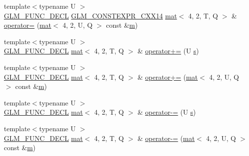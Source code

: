 \begin{DoxyCompactItemize}
\item 
{\footnotesize template$<$typename U $>$ }\\\mbox{\hyperlink{setup_8hpp_ab2d052de21a70539923e9bcbf6e83a51}{G\+L\+M\+\_\+\+F\+U\+N\+C\+\_\+\+D\+E\+CL}} \mbox{\hyperlink{setup_8hpp_a4dd12abf5e1164bc57f3a34671d03844}{G\+L\+M\+\_\+\+C\+O\+N\+S\+T\+E\+X\+P\+R\+\_\+\+C\+X\+X14}} \mbox{\hyperlink{structglm_1_1mat}{mat}}$<$ 4, 2, T, Q $>$ \& \mbox{\hyperlink{structglm_1_1mat_3_014_00_012_00_01_t_00_01_q_01_4_a40494ccea0b2ac5816c33779b9e25d74}{operator=}} (\mbox{\hyperlink{structglm_1_1mat}{mat}}$<$ 4, 2, U, Q $>$ const \&\mbox{\hyperlink{_s_d_l__opengl__glext_8h_af593500c283bf1a787a6f947f503a5c2}{m}})
\item 
{\footnotesize template$<$typename U $>$ }\\\mbox{\hyperlink{setup_8hpp_ab2d052de21a70539923e9bcbf6e83a51}{G\+L\+M\+\_\+\+F\+U\+N\+C\+\_\+\+D\+E\+CL}} \mbox{\hyperlink{structglm_1_1mat}{mat}}$<$ 4, 2, T, Q $>$ \& \mbox{\hyperlink{structglm_1_1mat_3_014_00_012_00_01_t_00_01_q_01_4_ada841f0d997158c603b39e19bea7686c}{operator+=}} (U \mbox{\hyperlink{_s_d_l__opengl_8h_a4af680a6c683f88ed67b76f207f2e6e4}{s}})
\item 
{\footnotesize template$<$typename U $>$ }\\\mbox{\hyperlink{setup_8hpp_ab2d052de21a70539923e9bcbf6e83a51}{G\+L\+M\+\_\+\+F\+U\+N\+C\+\_\+\+D\+E\+CL}} \mbox{\hyperlink{structglm_1_1mat}{mat}}$<$ 4, 2, T, Q $>$ \& \mbox{\hyperlink{structglm_1_1mat_3_014_00_012_00_01_t_00_01_q_01_4_a18b8087339b47fc3f24babd08b729968}{operator+=}} (\mbox{\hyperlink{structglm_1_1mat}{mat}}$<$ 4, 2, U, Q $>$ const \&\mbox{\hyperlink{_s_d_l__opengl__glext_8h_af593500c283bf1a787a6f947f503a5c2}{m}})
\item 
{\footnotesize template$<$typename U $>$ }\\\mbox{\hyperlink{setup_8hpp_ab2d052de21a70539923e9bcbf6e83a51}{G\+L\+M\+\_\+\+F\+U\+N\+C\+\_\+\+D\+E\+CL}} \mbox{\hyperlink{structglm_1_1mat}{mat}}$<$ 4, 2, T, Q $>$ \& \mbox{\hyperlink{structglm_1_1mat_3_014_00_012_00_01_t_00_01_q_01_4_a2154501995309db9c93fb4972f39f17c}{operator-\/=}} (U \mbox{\hyperlink{_s_d_l__opengl_8h_a4af680a6c683f88ed67b76f207f2e6e4}{s}})
\item 
{\footnotesize template$<$typename U $>$ }\\\mbox{\hyperlink{setup_8hpp_ab2d052de21a70539923e9bcbf6e83a51}{G\+L\+M\+\_\+\+F\+U\+N\+C\+\_\+\+D\+E\+CL}} \mbox{\hyperlink{structglm_1_1mat}{mat}}$<$ 4, 2, T, Q $>$ \& \mbox{\hyperlink{structglm_1_1mat_3_014_00_012_00_01_t_00_01_q_01_4_a965c05f65e92e3c87e4a1e36f80c1d82}{operator-\/=}} (\mbox{\hyperlink{structglm_1_1mat}{mat}}$<$ 4, 2, U, Q $>$ const \&\mbox{\hyperlink{_s_d_l__opengl__glext_8h_af593500c283bf1a787a6f947f503a5c2}{m}})

\end{DoxyCompactItemize}

